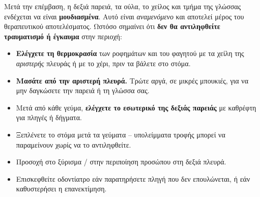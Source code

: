 \documentclass[10pt,greek]{article}
\begin{document}
\begin{enumerate}[label=\arabic*.]
Μετά την επέμβαση, η δεξιά παρειά, τα ούλα, το χείλος και τμήμα της γλώσσας ενδέχεται να είναι \textbf{μουδιασμένα}. Αυτό είναι \emph{αναμενόμενο} και αποτελεί μέρος του θεραπευτικού αποτελέσματος. Ωστόσο σημαίνει ότι \textbf{δεν θα αντιληφθείτε τραυματισμό ή έγκαυμα} στην περιοχή:
       \begin{itemize}
\item \textbf{Ελέγχετε τη θερμοκρασία} των ροφημάτων και του φαγητού με τα χείλη της \emph{αριστερής} πλευράς ή με το χέρι, πριν τα βάλετε στο στόμα.
\item \textbf{Μασάτε από την αριστερή πλευρά.} Τρώτε αργά, σε μικρές μπουκιές, για να μην δαγκώσετε την παρειά ή τη γλώσσα σας.
\item Μετά από κάθε γεύμα, \textbf{ελέγχετε το εσωτερικό της δεξιάς παρειάς} με καθρέφτη για πληγές ή δήγματα.
\item Ξεπλένετε το στόμα μετά τα γεύματα -- υπολείμματα τροφής μπορεί να παραμείνουν χωρίς να το αντιληφθείτε.
\item Προσοχή στο ξύρισμα / στην περιποίηση προσώπου στη δεξιά πλευρά.
\item Επισκεφθείτε οδοντίατρο εάν παρατηρήσετε πληγή που δεν επουλώνεται, ή εάν καθυστερήσει η επανεκτίμηση.
    \end{itemize}
\end{enumerate}
\end{document}
